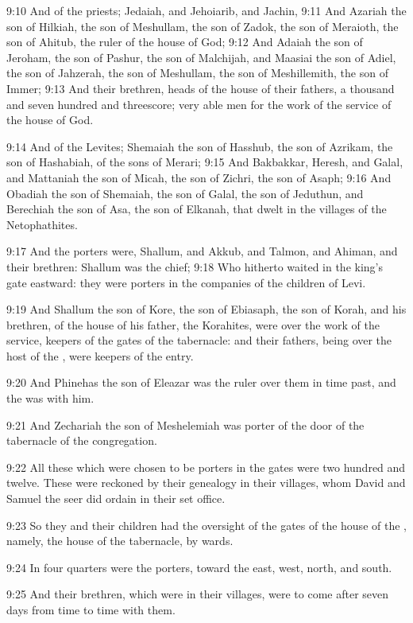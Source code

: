 9:10 And of the priests; Jedaiah, and Jehoiarib, and Jachin, 9:11 And
Azariah the son of Hilkiah, the son of Meshullam, the son of Zadok,
the son of Meraioth, the son of Ahitub, the ruler of the house of God;
9:12 And Adaiah the son of Jeroham, the son of Pashur, the son of
Malchijah, and Maasiai the son of Adiel, the son of Jahzerah, the son
of Meshullam, the son of Meshillemith, the son of Immer; 9:13 And
their brethren, heads of the house of their fathers, a thousand and
seven hundred and threescore; very able men for the work of the
service of the house of God.

9:14 And of the Levites; Shemaiah the son of Hasshub, the son of
Azrikam, the son of Hashabiah, of the sons of Merari; 9:15 And
Bakbakkar, Heresh, and Galal, and Mattaniah the son of Micah, the son
of Zichri, the son of Asaph; 9:16 And Obadiah the son of Shemaiah, the
son of Galal, the son of Jeduthun, and Berechiah the son of Asa, the
son of Elkanah, that dwelt in the villages of the Netophathites.

9:17 And the porters were, Shallum, and Akkub, and Talmon, and Ahiman,
and their brethren: Shallum was the chief; 9:18 Who hitherto waited in
the king's gate eastward: they were porters in the companies of the
children of Levi.

9:19 And Shallum the son of Kore, the son of Ebiasaph, the son of
Korah, and his brethren, of the house of his father, the Korahites,
were over the work of the service, keepers of the gates of the
tabernacle: and their fathers, being over the host of the \LORD, were
keepers of the entry.

9:20 And Phinehas the son of Eleazar was the ruler over them in time
past, and the \LORD was with him.

9:21 And Zechariah the son of Meshelemiah was porter of the door of
the tabernacle of the congregation.

9:22 All these which were chosen to be porters in the gates were two
hundred and twelve. These were reckoned by their genealogy in their
villages, whom David and Samuel the seer did ordain in their set
office.

9:23 So they and their children had the oversight of the gates of the
house of the \LORD, namely, the house of the tabernacle, by wards.

9:24 In four quarters were the porters, toward the east, west, north,
and south.

9:25 And their brethren, which were in their villages, were to come
after seven days from time to time with them.

